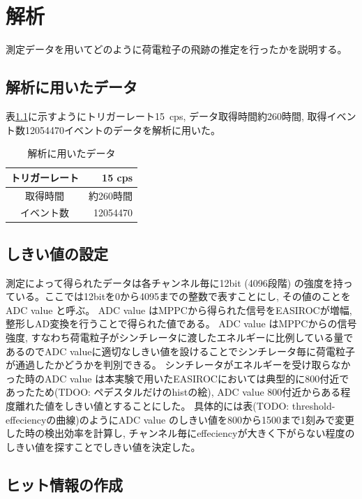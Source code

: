 \chapter{解析}\label{analysis}
測定データを用いてどのように荷電粒子の飛跡の推定を行ったかを説明する。

\section{解析に用いたデータ}
表\ref{tab:analyzed_data}に示すようにトリガーレート15\ cps, データ取得時間約260時間, 取得イベント数12054470イベントのデータを解析に用いた。
\begin{table}[H]
    \centering
    \caption{解析に用いたデータ}
    \label{tab:analyzed_data}
    \begin{tabular}{|c|r|}
        \hline
        トリガーレート & 15 cps    \\ \hline
        取得時間       & 約260時間 \\ \hline
        イベント数     & 12054470  \\ \hline
    \end{tabular}
\end{table}

\section{しきい値の設定}\label{sec:anal:threshold}
測定によって得られたデータは各チャンネル毎に12bit (4096段階) の強度を持っている。ここでは12bitを0から4095までの整数で表すことにし, その値のことを ADC value と呼ぶ。
ADC value はMPPCから得られた信号をEASIROCが増幅, 整形しAD変換を行うことで得られた値である。
ADC value はMPPCからの信号強度, すなわち荷電粒子がシンチレータに渡したエネルギーに比例している量であるのでADC valueに適切なしきい値を設けることでシンチレータ毎に荷電粒子が通過したかどうかを判別できる。
シンチレータがエネルギーを受け取らなかった時のADC value は本実験で用いたEASIROCにおいては典型的に800付近であったため(TDOO: ペデスタルだけのhistの絵), ADC value 800付近からある程度離れた値をしきい値とすることにした。
具体的には表(TODO: threshold-effeciencyの曲線)のようにADC value のしきい値を800から1500まで1刻みで変更した時の検出効率を計算し, チャンネル毎にeffeciencyが大きく下がらない程度のしきい値を探すことでしきい値を決定した。

\section{ヒット情報の作成}
